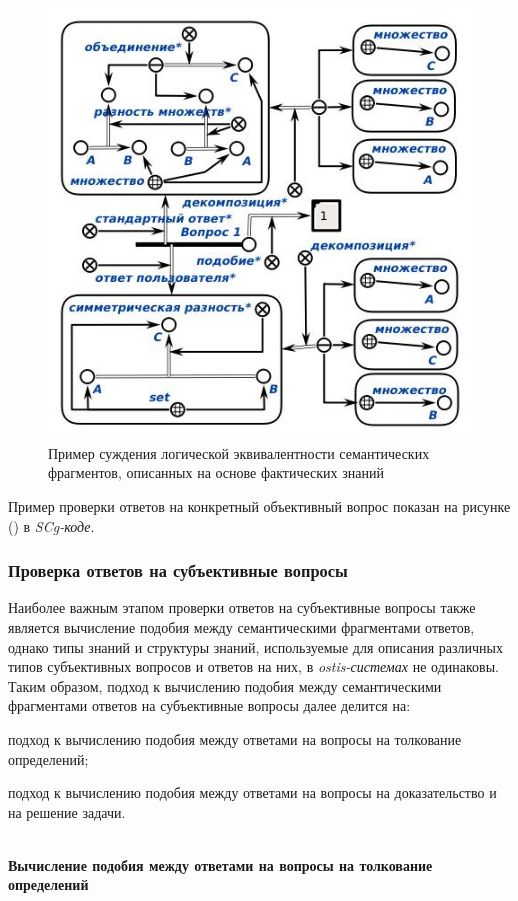 \begin{figure}[H]
	\includegraphics[scale=0.7]{author/part7/figures/logical_equivalence_example.jpg}
	\caption{Пример суждения логической эквивалентности семантических фрагментов, описанных на основе фактических знаний}
	\label{fig:LE_example}
\end{figure}

Пример проверки ответов на конкретный объективный вопрос показан на рисунке (\textit{}) в \textit{SCg-коде}.

\subsubsection{Проверка ответов на субъективные вопросы}
\label{subsubsec_checking_answers_subjective_questions}

Наиболее важным этапом проверки ответов на субъективные вопросы также является вычисление подобия между семантическими фрагментами ответов, однако типы знаний и структуры знаний, используемые для описания различных типов субъективных вопросов и ответов на них, в \textit{ostis-системах} не одинаковы. Таким образом, подход к вычислению подобия между семантическими фрагментами ответов на субъективные вопросы далее делится на:

\begin{textitemize}
	\item подход к вычислению подобия между ответами на вопросы на толкование определений;
	\item подход к вычислению подобия между ответами на вопросы на доказательство и на решение задачи.
\end{textitemize} 
~\\
\textbf{Вычисление подобия между ответами на вопросы на толкование определений} 

